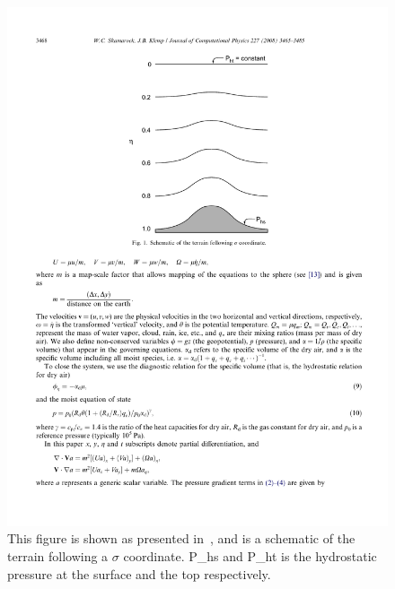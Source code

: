 \begin{figure}
\label{fig:sigma}
\centering
\includegraphics[width=\textwidth]{sigma}
\caption{This figure is shown as presented in~\cite{Skamarock2008}, and is a schematic of the terrain following a $\sigma$ coordinate. P_{hs} and P_{ht} is the hydrostatic pressure at the surface and the top respectively.}
\end{figure}

